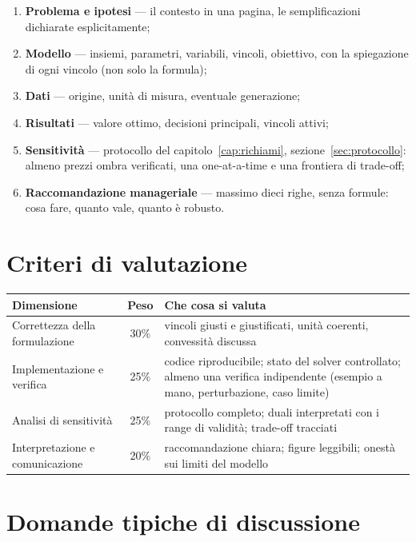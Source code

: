 \begin{enumerate}
  \item \textbf{Problema e ipotesi} --- il contesto in una pagina, le semplificazioni
        dichiarate esplicitamente;
  \item \textbf{Modello} --- insiemi, parametri, variabili, vincoli, obiettivo, con la
        spiegazione di ogni vincolo (non solo la formula);
  \item \textbf{Dati} --- origine, unità di misura, eventuale generazione;
  \item \textbf{Risultati} --- valore ottimo, decisioni principali, vincoli attivi;
  \item \textbf{Sensitività} --- protocollo del capitolo~\ref{cap:richiami},
        sezione~\ref{sec:protocollo}: almeno prezzi ombra verificati, una
        one-at-a-time e una frontiera di trade-off;
  \item \textbf{Raccomandazione manageriale} --- massimo dieci righe, senza formule:
        cosa fare, quanto vale, quanto è robusto.
\end{enumerate}

\section{Criteri di valutazione}

\begin{center}\small
\begin{tabular}{lc p{7.6cm}}
\toprule
Dimensione & Peso & Che cosa si valuta \\
\midrule
Correttezza della formulazione & 30\% & vincoli giusti e giustificati, unità coerenti,
convessità discussa \\
Implementazione e verifica & 25\% & codice riproducibile; stato del solver
controllato; almeno una verifica indipendente (esempio a mano, perturbazione,
caso limite) \\
Analisi di sensitività & 25\% & protocollo completo; duali interpretati con i range
di validità; trade-off tracciati \\
Interpretazione e comunicazione & 20\% & raccomandazione chiara; figure leggibili;
onestà sui limiti del modello \\
\bottomrule
\end{tabular}
\end{center}

\section{Domande tipiche di discussione}

